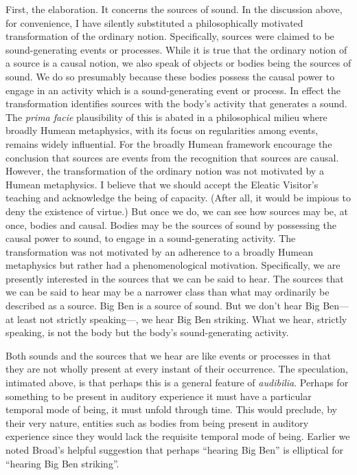 First, the elaboration. It concerns the sources of sound. In the discussion above, for convenience, I have silently substituted a philosophically motivated transformation of the ordinary notion. Specifically, sources were claimed to be sound-generating events or processes. While it is true that the ordinary notion of a source is a causal notion, we also speak of objects or bodies being the sources of sound. We do so presumably because these bodies possess the causal power to engage in an activity which is a sound-generating event or process. In effect the transformation identifies sources with the body's activity that generates a sound. The \emph{prima facie} plausibility of this is abated in a philosophical milieu where broadly Humean metaphysics, with its focus on regularities among events, remains widely influential. For the broadly Humean framework encourage the conclusion that sources are events from the recognition that sources are causal. However, the transformation of the ordinary notion was not motivated by a Humean metaphysics. I believe that we should accept the Eleatic Visitor's teaching and acknowledge the being of capacity. (After all, it would be impious to deny the existence of virtue.) But once we do, we can see how sources may be, at once, bodies and causal. Bodies may be the sources of sound by possessing the causal power to sound, to engage in a sound-generating activity. The transformation was not motivated by an adherence to a broadly Humean metaphysics but rather had a phenomenological motivation. Specifically, we are presently interested in the sources that we can be said to hear. The sources that we can be said to hear may be a narrower class than what may ordinarily be described as a source. Big Ben is a source of sound. But we don't hear Big Ben---at least not strictly speaking---, we hear Big Ben striking. What we hear, strictly speaking, is not the body but the body's sound-generating activity. 

Both sounds and the sources that we hear are like events or processes in that they are not wholly present at every instant of their occurrence. The speculation, intimated above, is that perhaps this is a general feature of \emph{audibilia}. Perhaps for something to be present in auditory experience it must have a particular temporal mode of being, it must unfold through time. This would preclude, by their very nature, entities such as bodies from being present in auditory experience since they would lack the requisite temporal mode of being. Earlier we noted Broad's helpful suggestion that perhaps ``hearing Big Ben'' is elliptical for ``hearing Big Ben striking''. 

